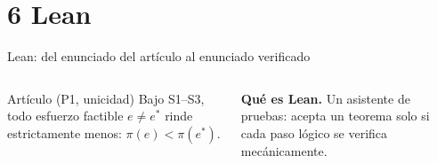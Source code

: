 \documentclass[aspectratio=169,10pt,t]{beamer}
\newcommand{\es}{e^{*}}
\begin{document}
\section{6 Lean}

\begin{frame}[fragile]{Lean: del enunciado del artículo al enunciado verificado}
\vspace{-2.5mm}
\begin{columns}[T,onlytextwidth]
\begin{propbox}{Artículo (P1, unicidad)}
\small Bajo S1--S3, todo esfuerzo factible $e\neq \es$ rinde estrictamente menos:
$\pi(e)<\pi(\es)$.
\end{propbox}
\begin{plainbox}\footnotesize\raggedright
\textbf{Qué es Lean.} Un asistente de pruebas: acepta un teorema solo si cada paso
lógico se verifica mecánicamente.


\end{plainbox}
\end{columns}
\end{frame}
\end{document}
